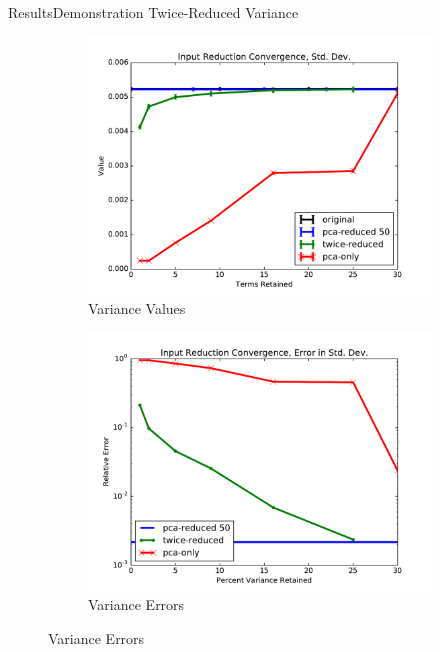 \documentclass{beamer}
\begin{document}
\begin{frame}{Results}{Demonstration Twice-Reduced Variance}
  \begin{figure}[h!]
    \centering
    \begin{subfigure}[b]{0.49\textwidth}
      \includegraphics[width=\textwidth]{graphics/var}
      \caption{Variance Values}
      \label{twice 9v variance val}
    \end{subfigure}
    \begin{subfigure}[b]{0.49\textwidth}
      \includegraphics[width=\textwidth]{graphics/var_err}
      \caption{Variance Errors}
      \label{twice 9v variance err}
    \end{subfigure}
  \end{figure}
\end{frame}
\end{document}
